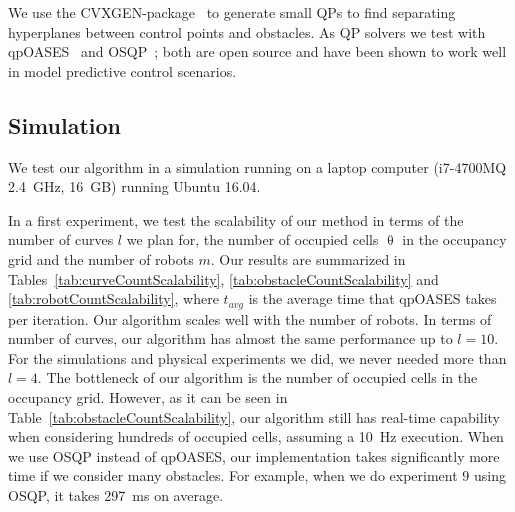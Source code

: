 \documentclass{svproc}
\begin{document}
We use the CVXGEN-package~\cite{cvxgen} to generate small QPs to find separating hyperplanes between control points and obstacles.
As QP solvers we test with qpOASES~\cite{qpOASES} and OSQP~\cite{osqp}; both are open source and have been shown to work well in model predictive control scenarios. 


\subsection{Simulation}
We test our algorithm in a simulation running on a laptop computer (i7-4700MQ \SI{2.4}{GHz}, \SI{16}{GB}) running Ubuntu 16.04.

In a first experiment, we test the scalability of our method in terms of the number of curves $l$ we plan for, the number of occupied cells $\uptheta$ in the occupancy grid and the number of robots $m$.
Our results are summarized in Tables~\ref{tab:curveCountScalability}, \ref{tab:obstacleCountScalability} and \ref{tab:robotCountScalability}, where $t_{avg}$ is the average time that qpOASES takes per iteration.
Our algorithm scales well with the number of robots.
In terms of number of curves, our algorithm has almost the same performance up to $l=10$. For the simulations and physical experiments we did, we never needed more than $l=4$.
The bottleneck of our algorithm is the number of occupied cells in the occupancy grid. However, as it can be seen in Table~\ref{tab:obstacleCountScalability}, our algorithm still has real-time capability when considering hundreds of occupied cells, assuming a \SI{10}{Hz} execution.
When we use OSQP instead of qpOASES, our implementation takes significantly more time if we consider many obstacles.
For example, when we do experiment $9$ using OSQP, it takes \SI{297}{ms} on average.
\end{document}
